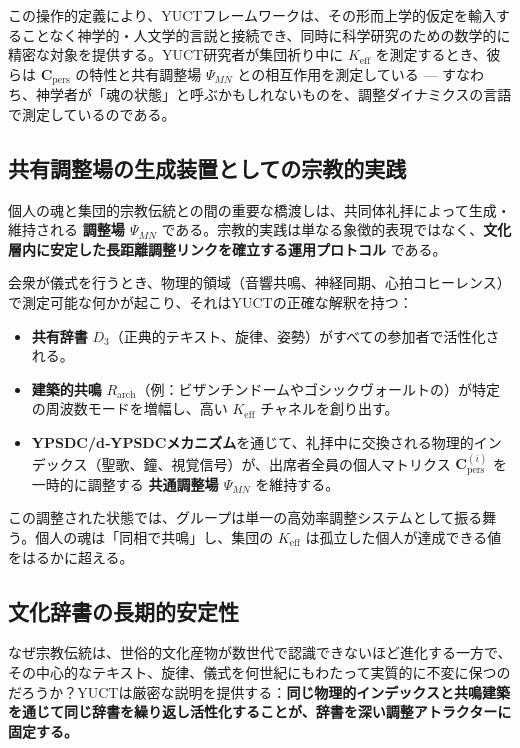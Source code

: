 \documentclass[12pt,a4paper]{article}
\begin{document}
	この操作的定義により、YUCTフレームワークは、その形而上学的仮定を輸入することなく神学的・人文学的言説と接続でき、同時に科学研究のための数学的に精密な対象を提供する。YUCT研究者が集団祈り中に \(K_{\mathrm{eff}}\) を測定するとき、彼らは \(\mathbf{C}_{\text{pers}}\) の特性と共有調整場 \(\Psi_{MN}\) との相互作用を測定している — すなわち、神学者が「魂の状態」と呼ぶかもしれないものを、調整ダイナミクスの言語で測定しているのである。
	
	\subsection{共有調整場の生成装置としての宗教的実践}
	
	個人の魂と集団的宗教伝統との間の重要な橋渡しは、共同体礼拝によって生成・維持される \textbf{調整場 \(\Psi_{MN}\)} である。宗教的実践は単なる象徴的表現ではなく、\textbf{文化層内に安定した長距離調整リンクを確立する運用プロトコル} である。
	
	会衆が儀式を行うとき、物理的領域（音響共鳴、神経同期、心拍コヒーレンス）で測定可能な何かが起こり、それはYUCTの正確な解釈を持つ：
	\begin{itemize}
		\item \textbf{共有辞書} \(D_3\)（正典的テキスト、旋律、姿勢）がすべての参加者で活性化される。
		\item \textbf{建築的共鳴} \(R_{\mathrm{arch}}\)（例：ビザンチンドームやゴシックヴォールトの）が特定の周波数モードを増幅し、高い \(K_{\mathrm{eff}}\) チャネルを創り出す。
		\item \textbf{YPSDC/d‑YPSDCメカニズム}を通じて、礼拝中に交換される物理的インデックス（聖歌、鐘、視覚信号）が、出席者全員の個人マトリクス \(\mathbf{C}_{\text{pers}}^{(i)}\) を一時的に調整する \textbf{共通調整場 \(\Psi_{MN}\)} を維持する。
	\end{itemize}
	
	この調整された状態では、グループは単一の高効率調整システムとして振る舞う。個人の魂は「同相で共鳴」し、集団の \(K_{\mathrm{eff}}\) は孤立した個人が達成できる値をはるかに超える。
	
	\subsection{文化辞書の長期的安定性}
	
	なぜ宗教伝統は、世俗的文化産物が数世代で認識できないほど進化する一方で、その中心的なテキスト、旋律、儀式を何世紀にもわたって実質的に不変に保つのだろうか？YUCTは厳密な説明を提供する：\textbf{同じ物理的インデックスと共鳴建築を通じて同じ辞書を繰り返し活性化することが、辞書を深い調整アトラクターに固定する。}
	
\end{document}
